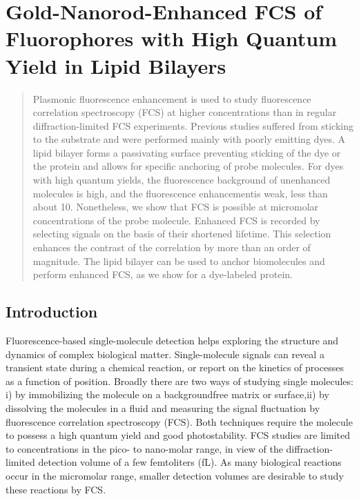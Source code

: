 \chapter{Gold-Nanorod-Enhanced FCS of Fluorophores with High Quantum Yield in Lipid Bilayers}
\label{chapter:EFCS}

\graphicspath{{chapters/c2_bilayer_efcs/figure/}}
\begin{abstract}
	Plasmonic fluorescence enhancement is used to study fluorescence correlation spectroscopy (FCS) at higher concentrations than in regular diffraction-limited FCS experiments.
	Previous studies suffered from sticking to the substrate and were performed mainly with poorly emitting dyes.
	A lipid bilayer forms a passivating surface preventing sticking of the dye or the protein and allows for specific anchoring of probe molecules.
	For dyes with high quantum yields, the fluorescence background of unenhanced molecules is high, and the fluorescence enhancementis weak, less than about 10.
	Nonetheless, we show that FCS is possible at micromolar concentrations of the probe molecule.
	Enhanced FCS is recorded by selecting signals on the basis of their shortened lifetime.
	This selection enhances the contrast of the correlation by more than an order of magnitude.
	The lipid bilayer can be used to anchor biomolecules and perform enhanced FCS, as we show for a dye-labeled protein.
\end{abstract}
\pagebreak
\section{Introduction}
Fluorescence-based single-molecule detection helps exploring the structure and dynamics of complex biological matter.\cite{moerner1999illuminating,weiss1999fluorescence}
Single-molecule signals can reveal a transient state during a chemical reaction, or report on the kinetics of processes as a function of position.
Broadly there are two ways of studying single molecules: i) by immobilizing the molecule on a backgroundfree matrix or surface,ii) by dissolving the molecules in a fluid and measuring the signal fluctuation by fluorescence correlation spectroscopy (FCS).\cite{Magde1972}
Both techniques require the molecule to possess a high quantum yield and good photostability.
FCS studies are limited to concentrations in the pico- to nano-molar range, in view of the diffraction-limited detection volume of a few femtoliters (fL).
As many biological reactions occur in the micromolar range\cite{craighead2006future}, smaller detection volumes are desirable to study these reactions by FCS.

